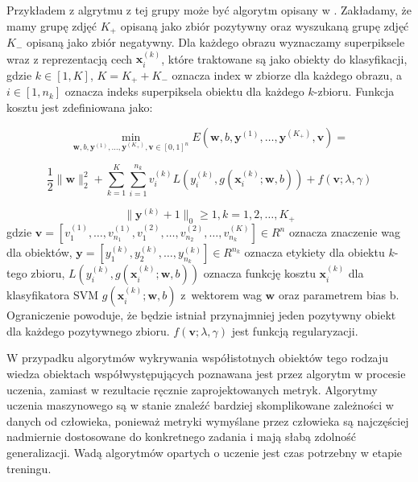 \documentclass[a4paper,12pt,twoside,openany]{report}
\begin{document}
	Przykładem z algrytmu z tej grupy może być algorytm opisany w \cite{10.1109/TPAMI.2016.2567393}. Zakładamy, że mamy grupę zdjęć $K_+$ opisaną jako zbiór pozytywny oraz wyszukaną grupę zdjęć $K_-$ opisaną jako zbiór negatywny. Dla każdego obrazu wyznaczamy superpiksele wraz z reprezentacją cech $\mathbf{x}_i^{(k)}$, które traktowane są jako obiekty do klasyfikacji, gdzie $k \in [1, K]$, $K=K_+ + K_-$ oznacza index w zbiorze dla każdego obrazu, a $i \in [1, n_k]$ oznacza indeks superpiksela obiektu dla każdego $k$-zbioru. Funkcja kosztu jest zdefiniowana jako:

	\begin{equation}
		\min_{\mathbf{w},b,\mathbf{y}^{(1)}, \dots, \mathbf{y}^{(K_+)},\mathbf{v}\in[0,1]^n} E(\mathbf{w},b,\mathbf{y}^{(1)}, \dots, \mathbf{y}^{(K_+)},\mathbf{v}) = 
	\end{equation}

	\begin{equation}
		\frac{1}{2} \|\mathbf{w}\|^2_2 + \sum_{k=1}^K \sum_{i=1}^{n_k}v_i^{(k)} L(y_i^{(k)}, g(\mathbf{x}^{(k)}_i;\mathbf{w},b)) + f(\mathbf{v};\lambda, \gamma)
	\end{equation}

	\begin{equation}
	\|\mathbf{y}^{(k)}+1\|_0 \geq 1, k=1,2,\dots,K_+
	\end{equation}
	gdzie $\mathbf{v} = [v_1^{(1)}, \dots, v_{n_1}^{(1)}, v_{1}^{(2)}, \dots, v_{n_2}^{(2)}, \dots, v_{n_k}^{(K)}] \in R^{n}$ oznacza znaczenie wag dla obiektów, $\mathbf{y} = [y_1^{(k)}, y_{2}^{(k)}, \dots, y_{n_k}^{(k)}] \in R^{n_k}$ oznacza etykiety dla obiektu $k$-tego zbioru, $L(y_i^{(k)}, g(\mathbf{x}^{(k)}_i;\mathbf{w},b))$ oznacza funkcję kosztu $\mathbf{x}_i^{(k)}$ dla klasyfikatora SVM $g(\mathbf{x}^{(k)}_i;\mathbf{w},b)$ z~wektorem wag $\mathbf{w}$ oraz parametrem bias b. Ograniczenie powoduje, że będzie istniał przynajmniej jeden pozytywny obiekt dla każdego pozytywnego zbioru. $f(\mathbf{v};\lambda, \gamma)$ jest funkcją regularyzacji.

	W przypadku algorytmów wykrywania współistotnych obiektów tego rodzaju wiedza obiektach współwystępujących poznawana jest przez algorytm w procesie uczenia, zamiast w rezultacie ręcznie zaprojektowanych metryk. Algorytmy uczenia maszynowego są w stanie znaleźć bardziej skomplikowane zależności w danych od człowieka, ponieważ metryki wymyślane przez człowieka są najczęściej nadmiernie dostosowane do konkretnego zadania i mają słabą zdolność generalizacji. Wadą algorytmów opartych o uczenie jest czas potrzebny w etapie treningu.
\end{document}
